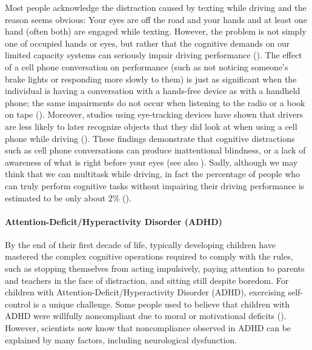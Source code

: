 \documentclass[
]{krantz}
\begin{document}
Most people acknowledge the distraction caused by texting while driving and the reason seems obvious: Your eyes are off the road and your hands and at least one hand (often both) are engaged while texting. However, the problem is not simply one of occupied hands or eyes, but rather that the cognitive demands on our limited capacity systems can seriously impair driving performance (). The effect of a cell phone conversation on performance (such as not noticing someone's brake lights or responding more slowly to them) is just as significant when the individual is having a conversation with a hands-free device as with a handheld phone; the same impairments do not occur when listening to the radio or a book on tape (). Moreover, studies using eye-tracking devices have shown that drivers are less likely to later recognize objects that they did look at when using a cell phone while driving (). These findings demonstrate that cognitive distractions such as cell phone conversations can produce inattentional blindness, or a lack of awareness of what is right before your eyes (see also ). Sadly, although we may think that we can multitask while driving, in fact the percentage of people who can truly perform cognitive tasks without impairing their driving performance is estimated to be only about 2\% ().

\paragraph*{Attention-Deficit/Hyperactivity Disorder (ADHD)}\label{attention-deficithyperactivity-disorder-adhd}

By the end of their first decade of life, typically developing children have mastered the complex cognitive operations required to comply with the rules, such as stopping themselves from acting impulsively, paying attention to parents and teachers in the face of distraction, and sitting still despite boredom. For children with Attention-Deficit/Hyperactivity Disorder (ADHD), exercising self-control is a unique challenge. Some people used to believe that children with ADHD were willfully noncompliant due to moral or motivational deficits (). However, scientists now know that noncompliance observed in ADHD can be explained by many factors, including neurological dysfunction.
\end{document}
